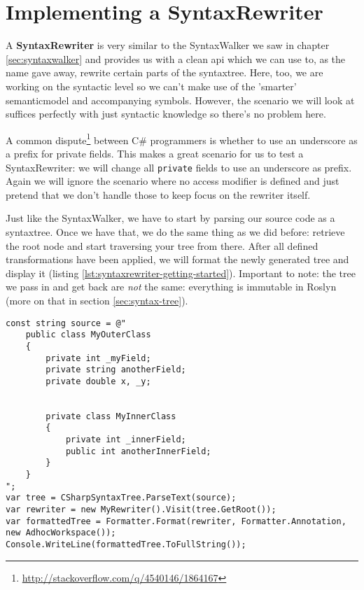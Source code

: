 \chapter{Implementing a SyntaxRewriter}
\label{sec:syntaxrewriter}

A \textbf{SyntaxRewriter} is very similar to the SyntaxWalker we saw in chapter \ref{sec:syntaxwalker} and provides us with a clean \gls{api} which we can use to, as the name gave away, rewrite certain parts of the \gls{syntaxtree}. Here, too, we are working on the syntactic level so we can't make use of the 'smarter' \gls{semanticmodel} and accompanying symbols. However, the scenario we will look at suffices perfectly with just syntactic knowledge so there's no problem here.

A common dispute\footnote{\url{http://stackoverflow.com/q/4540146/1864167}} between C\# programmers is whether to use an underscore as a prefix for private fields. This makes a great scenario for us to test a SyntaxRewriter: we will change all \texttt{private} fields to use an underscore as prefix. Again we will ignore the scenario where no access modifier is defined and just pretend that we don't handle those to keep focus on the rewriter itself.

Just like the SyntaxWalker, we have to start by parsing our source code as a \gls{syntaxtree}. Once we have that, we do the same thing as we did before: retrieve the root node and start traversing your tree from there. After all defined transformations have been applied, we will format the newly generated tree and display it (listing \ref{lst:syntaxrewriter-getting-started}). Important to note: the tree we pass in and get back are \textit{not} the same: everything is \gls{immutable} in Roslyn (more on that in section \ref{sec:syntax-tree}).

\begin{lstlisting}[label={lst:syntaxrewriter-getting-started}]
const string source = @"
	public class MyOuterClass
	{
	    private int _myField;
	    private string anotherField;
	    private double x, _y;
	    
	
	    private class MyInnerClass
	    {
	        private int _innerField;
	        public int anotherInnerField;
	    }
	}
";
var tree = CSharpSyntaxTree.ParseText(source);
var rewriter = new MyRewriter().Visit(tree.GetRoot());
var formattedTree = Formatter.Format(rewriter, Formatter.Annotation, new AdhocWorkspace());
Console.WriteLine(formattedTree.ToFullString());
\end{lstlisting}

